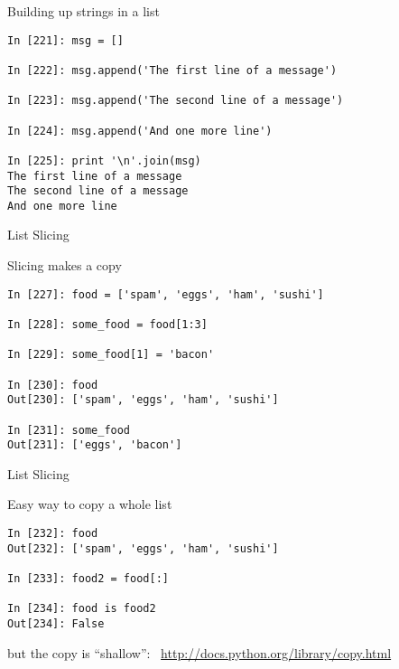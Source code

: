\documentclass{beamer}
\begin{document}
\begin{frame}[fragile]{Building up strings in a list}

\begin{verbatim}
In [221]: msg = []

In [222]: msg.append('The first line of a message')

In [223]: msg.append('The second line of a message')

In [224]: msg.append('And one more line')

In [225]: print '\n'.join(msg)
The first line of a message
The second line of a message
And one more line
\end{verbatim}

\end{frame} 

\begin{frame}[fragile]{List Slicing}

{\large Slicing makes a copy}

\begin{verbatim}
In [227]: food = ['spam', 'eggs', 'ham', 'sushi']

In [228]: some_food = food[1:3]

In [229]: some_food[1] = 'bacon'

In [230]: food
Out[230]: ['spam', 'eggs', 'ham', 'sushi']

In [231]: some_food
Out[231]: ['eggs', 'bacon']
\end{verbatim}

\end{frame}


\begin{frame}[fragile]{List Slicing}

{\large Easy way to copy a whole list}

\begin{verbatim}
In [232]: food
Out[232]: ['spam', 'eggs', 'ham', 'sushi']

In [233]: food2 = food[:]

In [234]: food is food2
Out[234]: False

\end{verbatim}

{\Large but the copy is ``shallow''}: \
\url{http://docs.python.org/library/copy.html}

\end{frame} 
\end{document}
